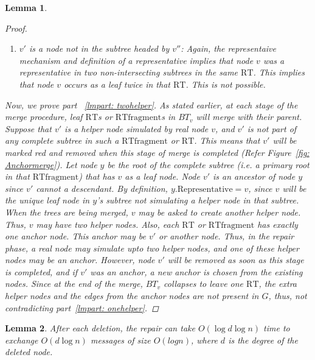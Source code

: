 \documentclass[11pt, letter]{article}
\newtheorem{lemma}{Lemma}
\newcommand{\RT}{\mathrm{RT}}
\newcommand{\RTfragment}{\mathrm{RTfragment}}
\newcommand{\representative}{\mathrm{Representative}}
\begin{document}
\begin{lemma}
\begin{proof}
\begin{enumerate}
\begin{enumerate}
node not  simulating a helper node in $y$'s subtree, but $v$ is already simulating $v'$ in $v''$'s subtree.
  \item \emph{$v'$ is a node not in the subtree headed by $v''$:}
   Again, the representaive mechanism and definition of a representative implies that node $v$ was a
representative in two non-intersecting subtrees in the same $\RT$. This implies that node $v$ occurs as a leaf
twice in that $\RT$. This is not possible. 
 \end{enumerate}
\end{enumerate}
 Now, we prove part~ \ref{lmpart: twohelper}. As stated earlier, at each stage of the merge procedure, leaf $\RT$s or
$\RTfragment$s in $BT_{v}$ will merge with their parent. Suppose that $v'$ is a helper node simulated by real node $v$,
and $v'$ is not part of any complete subtree in such a $\RTfragment$ or $\RT$. This means that $v'$ will be marked red
and removed when this stage of merge is completed (Refer Figure~\ref{fig: Anchormerge}). Let node $y$ be the root of the
 complete subtree (i.e. a primary root in that $\RTfragment$) that has $v$ as a leaf node. 
Node $v'$ is an ancestor of node $y$ since $v'$ cannot a descendant. By definition, $y.\representative = v$, since $v$
will be the unique leaf node in $y$'s subtree not simulating a helper node in that subtree.
 When the trees are being merged, $v$ may be asked to create another helper node. Thus, $v$ may have two helper nodes.
 Also, each $\RT$ or $\RTfragment$ has exactly one anchor node. This anchor may be $v'$ or another node. Thus, in the
repair phase, a real node may simulate upto two helper nodes, and one of these helper nodes may be an anchor.
 However, node $v'$ will be removed as soon as this stage is completed, and if $v'$ was an anchor, a new anchor is
chosen from the existing nodes. Since at the end of the merge, $BT_{v}$  collapses to leave one $\RT$, the extra helper
nodes and the edges from the anchor nodes are not present in $G$, thus, not contradicting part~\ref{lmpart: onehelper}.

\end{proof}
\end{lemma}

\begin{lemma}
\label{lemma: cost}
After each deletion, the repair can take $O(\log d\log n)$ time to exchange $O(d \log n)$ messages of size $O(log
n)$, where $d$ is the degree of the deleted node.
\end{lemma}
\end{document}
